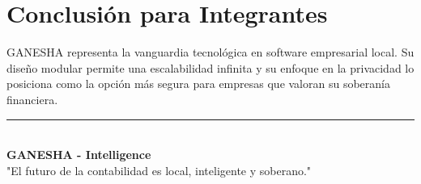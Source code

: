 \documentclass[11pt,a4paper]{article}
\begin{document}
\section{Conclusión para Integrantes}
GANESHA representa la vanguardia tecnológica en software empresarial local. Su diseño modular permite una escalabilidad infinita y su enfoque en la privacidad lo posiciona como la opción más segura para empresas que valoran su soberanía financiera.

\begin{center}
\vspace{1cm}
\textcolor{gold}{\rule{5cm}{1pt}}\\
\textbf{GANESHA - Intelligence}\\[0.2em]
"El futuro de la contabilidad es local, inteligente y soberano."
\end{center}
\end{document}
